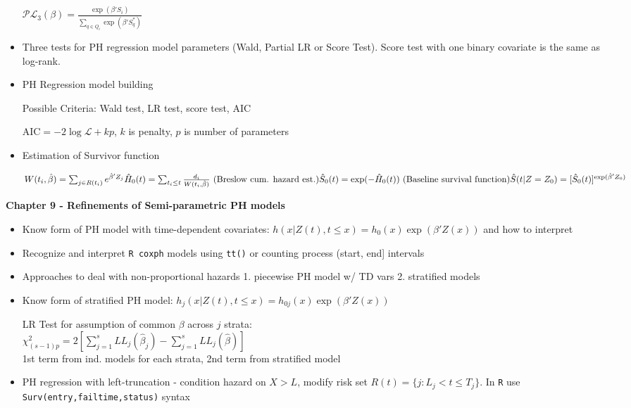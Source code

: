 \documentclass[11pt]{article}
\begin{document}
\begin{itemize}
	$\mathcal{PL}_3(\beta)=
	\frac{\exp(\beta'S_i)}{\sum_{q \in Q_i}\exp(\beta'S_q^*)}$
	
	\item Three tests for PH regression model parameters (Wald, Partial LR or Score Test). Score test with one binary covariate is the same as log-rank.
	
	\item PH Regression model building
	
	Possible Criteria: Wald test, LR test, score test, AIC
	
	AIC$= -2\log \mathcal{L} + kp$, $k$ is penalty, $p$ is number of parameters
	
	\item Estimation of Survivor function
	
	$
	W(t_i,\hat{\beta})=\sum_{j \in R(t_i)}e^{\hat{\beta}'Z_j}\\
	\hat{H}_0(t)=\sum_{t_i \le t}\frac{d_i}{W(t_i,\hat{\beta})} \text{ (Breslow cum. hazard est.)}\\
	\hat{S}_0(t)=\exp(-\hat{H}_0(t)) \text{ (Baseline survival function)}\\
	\hat{S}(t|Z=Z_0)=[\hat{S}_0(t)]^{\exp(\hat{\beta}'Z_0)}
	$	
\end{itemize}


\textbf{Chapter 9 - Refinements of Semi-parametric PH models}
\begin{itemize}
 \item	Know form of PH model with time-dependent covariates: $h(x|Z(t),t\le x)=h_0(x)\exp(\beta'Z(x))$ and how to interpret 
 
 \item Recognize and interpret \verb|R coxph| models using \verb|tt()| or counting process (start, end] intervals
 
 \item Approaches to deal with non-proportional hazards 1. piecewise PH model w/ TD vars 2. stratified models
 
 \item Know form of stratified PH model: $h_j(x|Z(t),t\le x)=h_{0j}(x)\exp(\beta'Z(x))$
 
 LR Test for assumption of common $\beta$ across $j$ strata:\\
 $\chi_{(s-1)p}^2 = 2[\sum_{j=1}^{s}LL_j(\hat{\beta}_{j}) - \sum_{j=1}^{s}LL_j(\hat{\beta})]$\\
 1st term from ind. models for each strata, 2nd term from stratified model 
 

 \item PH regression with left-truncation - condition hazard on $X>L$, modify risk set $R(t)=\{j:L_j<t\le T_j\}$.
 In \verb|R| use \verb|Surv(entry,failtime,status)| syntax
 
\end{itemize}
\end{document}
